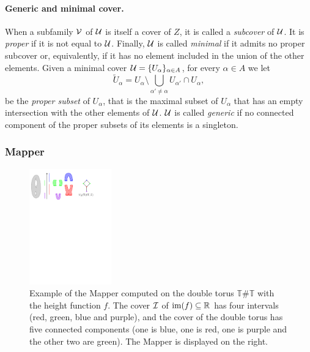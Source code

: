 \paragraph*{Generic and minimal cover.} 
When a subfamily $\mathcal{V}$ of $\mathcal{U}$ is itself a cover of $Z$, it is called
a {\em subcover} of $\mathcal{U}$. It is {\em proper} if it is not equal to $\mathcal{U}$. 
Finally, $\mathcal{U}$ is called {\em minimal} if it admits no proper
subcover or, equivalently, if it has no element included in the union
of the other elements.
%
Given a minimal cover $\mathcal{U}=\{U_\alpha\}_{\alpha\in A}$, for every
$\alpha\in A$ we let
%
\[
\tilde{U}_\alpha = U_\alpha \setminus \bigcup_{\alpha'\neq\alpha} U_{\alpha'}\cap U_\alpha,
\]
%
be the {\em proper subset} of $U_\alpha$,
that is the maximal subset of $U_\alpha$ that has an empty
intersection with the other elements of $\mathcal{U}$.
$\mathcal{U}$ is called {\em generic} if no connected component of the 
proper subsets of its elements is a singleton.






\subsubsection*{Mapper}
\label{sec:Mapperdef}

\begin{figure}[!t]\centering
\includegraphics[height = 5cm]{figures/MMapperMapperTorus}
\caption[Mapper on double torus]{\label{fig:mmappervsmappertorus} Example of the Mapper 
computed on the double torus $\mathbb T\# \mathbb T$ with the height function $f$. 
The cover $\mathcal{I}$ of $\mathrm{im}(f)\subseteq\mathbb{R}$ has four intervals (red, green, blue and purple), and the cover of the double torus 
has five connected components (one is blue, one is red, one is purple and the other two are green). 
The Mapper 
is displayed on the right.} 
\end{figure}

